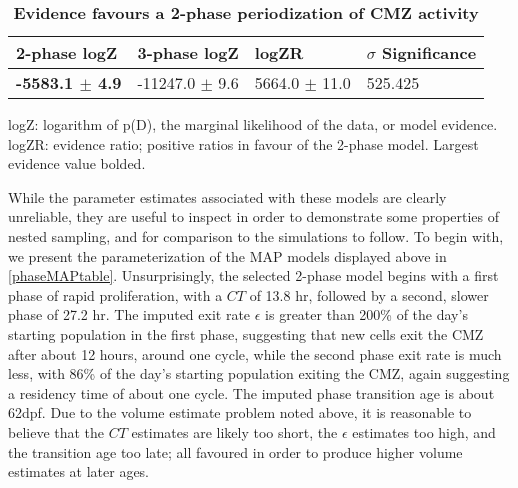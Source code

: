 \begin{table}[!ht]
    \centering
    \caption{{\bf Evidence favours a 2-phase periodization of CMZ activity}}
    \begin{tabular}{|l|l|l|l|} \hline 
        {\bf 2-phase logZ} & {\bf 3-phase logZ} & {\bf logZR} & {\bf $\sigma$ Significance}\\ \hline
        {\bf -5583.1 $\pm$ 4.9} & -11247.0 $\pm$ 9.6 & 5664.0 $\pm$ 11.0 & 525.425\\ \hline 
    \end{tabular}
    \begin{flushleft} logZ: logarithm of p(D), the marginal likelihood of the data, or model evidence. logZR: evidence ratio; positive ratios in favour of the 2-phase model. Largest evidence value bolded.
    \end{flushleft}
    \label{phasetable}
\end{table}

While the parameter estimates associated with these models are clearly unreliable, they are useful to inspect in order to demonstrate some properties of nested sampling, and for comparison to the simulations to follow. To begin with, we present the parameterization of the MAP models displayed above in \autoref{phaseMAPtable}. Unsurprisingly, the selected 2-phase model begins with a first phase of rapid proliferation, with a $CT$ of 13.8 hr, followed by a second, slower phase of 27.2 hr. The imputed exit rate $\epsilon$ is greater than 200\% of the day's starting population in the first phase, suggesting that new cells exit the CMZ after about 12 hours, around one cycle, while the second phase exit rate is much less, with 86\% of the day's starting population exiting the CMZ, again suggesting a residency time of about one cycle. The imputed phase transition age is about 62dpf. Due to the volume estimate problem noted above, it is reasonable to believe that the $CT$ estimates are likely too short, the $\epsilon$ estimates too high, and the transition age too late; all favoured in order to produce higher volume estimates at later ages.

